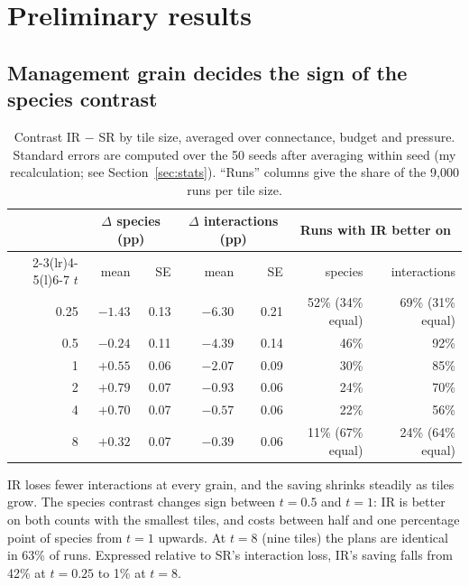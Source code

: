 \documentclass[11pt,a4paper]{article}
\begin{document}
\section{Preliminary results}

\subsection{Management grain decides the sign of the species contrast}

\begin{table}[H]
\centering
\caption{Contrast IR $-$ SR by tile size, averaged over connectance, budget and pressure. Standard errors
are computed over the 50 seeds after averaging within seed (my recalculation; see
Section~\ref{sec:stats}). ``Runs'' columns give the share of the 9,000 runs per tile size.}\label{tab:grain}
\small
\begin{tabular}{@{}rrrrrrr@{}}
\toprule
 & \multicolumn{2}{c}{$\Delta$ species (pp)} & \multicolumn{2}{c}{$\Delta$ interactions (pp)} &
 \multicolumn{2}{c}{Runs with IR better on} \\
\cmidrule(lr){2-3}\cmidrule(lr){4-5}\cmidrule(l){6-7}
$t$ & mean & SE & mean & SE & species & interactions \\
\midrule
0.25 & $-1.43$ & 0.13 & $-6.30$ & 0.21 & 52\% (34\% equal) & 69\% (31\% equal) \\
0.5  & $-0.24$ & 0.11 & $-4.39$ & 0.14 & 46\% & 92\% \\
1    & $+0.55$ & 0.06 & $-2.07$ & 0.09 & 30\% & 85\% \\
2    & $+0.79$ & 0.07 & $-0.93$ & 0.06 & 24\% & 70\% \\
4    & $+0.70$ & 0.07 & $-0.57$ & 0.06 & 22\% & 56\% \\
8    & $+0.32$ & 0.07 & $-0.39$ & 0.06 & 11\% (67\% equal) & 24\% (64\% equal) \\
\bottomrule
\end{tabular}
\end{table}

IR loses fewer interactions at every grain, and the saving shrinks steadily as tiles grow. The species
contrast changes sign between $t=0.5$ and $t=1$: IR is better on both counts with the smallest tiles, and
costs between half and one percentage point of species from $t=1$ upwards. At $t=8$ (nine tiles) the plans
are identical in 63\% of runs. Expressed relative to SR's interaction loss, IR's saving falls from 42\% at
$t=0.25$ to 1\% at $t=8$.
\end{document}
